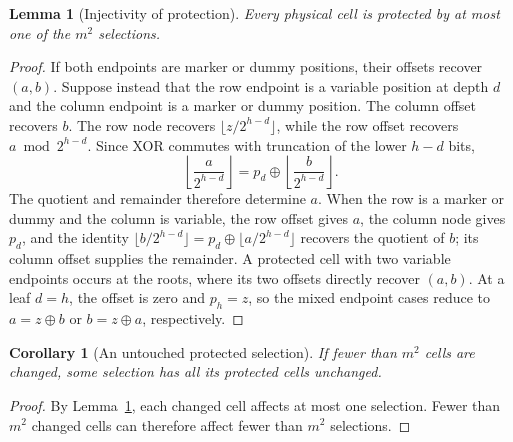 \documentclass[11pt]{article}
\newtheorem{lemma}[theorem]{Lemma}
\newtheorem{corollary}[theorem]{Corollary}
\begin{document}
\begin{lemma}[Injectivity of protection]\label{lem:injective}
Every physical cell is protected by at most one of the $m^2$ selections.
\end{lemma}
\begin{proof}
If both endpoints are marker or dummy positions, their offsets recover
$(a,b)$. Suppose instead that the row endpoint is a variable position at
depth $d$ and the column endpoint is a marker or dummy position. The
column offset recovers $b$. The row node recovers
$\lfloor z/2^{h-d}\rfloor$, while the row offset recovers
$a\bmod2^{h-d}$. Since XOR commutes with truncation of the lower $h-d$
bits,
\[
 \left\lfloor\frac a{2^{h-d}}\right\rfloor
 =p_d\mathbin{\oplus}
 \left\lfloor\frac b{2^{h-d}}\right\rfloor.
\]
The quotient and remainder therefore determine $a$. When the row is a
marker or dummy and the column is variable, the row offset gives $a$,
the column node gives $p_d$, and the identity
$\lfloor b/2^{h-d}\rfloor=p_d\mathbin{\oplus}\lfloor a/2^{h-d}\rfloor$
recovers the quotient of $b$; its column offset supplies the remainder.
A protected cell with two variable
endpoints occurs at the roots, where its two offsets directly recover
$(a,b)$. At a leaf $d=h$, the offset is zero and $p_h=z$, so the mixed
endpoint cases reduce to $a=z\mathbin{\oplus}b$ or
$b=z\mathbin{\oplus}a$, respectively.
\end{proof}

\begin{corollary}[An untouched protected selection]\label{cor:avoid}
If fewer than $m^2$ cells are changed, some selection has all its protected
cells unchanged.
\end{corollary}
\begin{proof}
By Lemma~\ref{lem:injective}, each changed cell affects at most one
selection. Fewer than $m^2$ changed cells can therefore affect fewer than
$m^2$ selections.
\end{proof}
\end{document}
